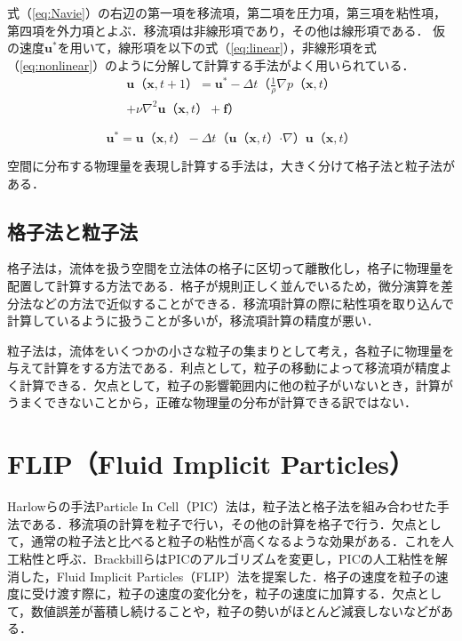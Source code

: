 \documentclass[10pt,a4paper,notitlepage,oneside,twocolumn]{abst_jsarticle}
\begin{document}
式（\ref{eq:Navie}）の右辺の第一項を移流項，第二項を圧力項，第三項を粘性項，第四項を外力項とよぶ．移流項は非線形項であり，その他は線形項である．
仮の速度$\bm{u}^*$を用いて，線形項を以下の式（\ref{eq:linear}），非線形項を式（\ref{eq:nonlinear}）のように分解して計算する手法がよく用いられている．
\begin{equation}\label{eq:linear}
\begin{split}
\bm{u}（\bm{x},t+1） =  \bm{u}^* - \varDelta t（\frac{1}{\rho}\nabla p（\bm{x},t）\\ + \nu\nabla^2\bm{u}（\bm{x},t） + \bm{f}）
\end{split}
\end{equation} 

\begin{equation}\label{eq:nonlinear}
\bm{u}^* = \bm{u}（\bm{x},t） - \varDelta t（\bm{u}（\bm{x},t） \boldsymbol{\cdot}\nabla）\bm{u}（\bm{x},t） 
\end{equation}

空間に分布する物理量を表現し計算する手法は，大きく分けて格子法と粒子法がある．
\subsection{格子法と粒子法} \label{subsec:grid}
格子法は，流体を扱う空間を立法体の格子に区切って離散化し，格子に物理量を配置して計算する方法である．格子が規則正しく並んでいるため，微分演算を差分法などの方法で近似することができる．移流項計算の際に粘性項を取り込んで計算しているように扱うことが多いが，移流項計算の精度が悪い．

粒子法は，流体をいくつかの小さな粒子の集まりとして考え，各粒子に物理量を与えて計算をする方法である．利点として，粒子の移動によって移流項が精度よく計算できる．欠点として，粒子の影響範囲内に他の粒子がいないとき，計算がうまくできないことから，正確な物理量の分布が計算できる訳ではない．

\section{FLIP（Fluid Implicit Particles）} \label{sec:FLIP}
Harlowらの手法Particle In Cell（PIC）法\cite{PIC}は，粒子法と格子法を組み合わせた手法である．移流項の計算を粒子で行い，その他の計算を格子で行う．欠点として，通常の粒子法と比べると粒子の粘性が高くなるような効果がある．これを人工粘性と呼ぶ．BrackbillらはPICのアルゴリズムを変更し，PICの人工粘性を解消した，Fluid Implicit Particles（FLIP）法\cite{FLIP}を提案した．格子の速度を粒子の速度に受け渡す際に，粒子の速度の変化分を，粒子の速度に加算する．欠点として，数値誤差が蓄積し続けることや，粒子の勢いがほとんど減衰しないなどがある．
\end{document}
